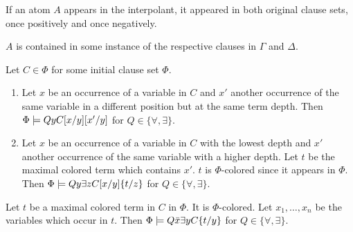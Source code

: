 \documentclass[,%
	paper=a4,%
	DIV14, 
	liststotoc,
	bibtotoc,
	draft=false,%
	numbers=noendperiod
]{scrartcl}
\begin{document}
\begin{lemma}
	\label{lemma:interpolant_atom_origin}
	If an atom $A$ appears in the interpolant, it appeared in both original clause sets, once positively and once negatively.

	$A$ is contained in some instance of the respective clauses in $\Gamma$ and $\Delta$.

\end{lemma}

\begin{lemma}
	Let $C \in \Phi$ for some initial clause set $\Phi$. 
	\begin{enumerate}
			\item
				Let $x$ be an occurrence of a variable in $C$ and $x'$ another occurrence of the same variable in a different position but at the same term depth.
				Then $\Phi \models Q y C[x/y][x'/y]$ for $Q \in \{\forall, \exists\}$.

			\item
				Let $x$ be an occurrence of a variable in $C$ with the lowest depth and $x'$ another occurrence of the same variable with a higher depth.
				Let $t$ be the maximal colored term which contains $x'$. $t$ is $\Phi$-colored since it appears in $\Phi$.
				Then $\Phi \models Q y \exists z C[x/y]\{t/z\}$ for $Q \in \{\forall, \exists\}$.
	\end{enumerate}
\end{lemma}

\begin{lemma}

	Let $t$ be a maximal colored term in $C$ in $\Phi$. It is $\Phi$-colored.
	Let $x_1, \ldots, x_n$ be the variables which occur in $t$.
	Then $\Phi \models Q \bar x \exists y C\{t/y\}$ for $Q \in \{\forall, \exists\}$.

\end{lemma}
\end{document}
